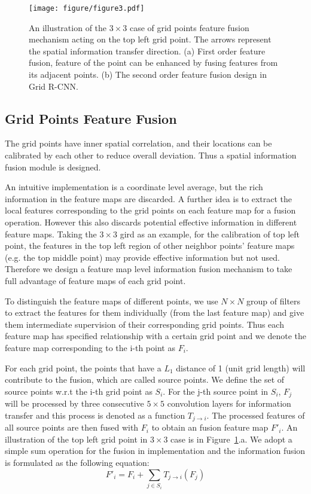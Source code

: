 \documentclass[10pt,twocolumn,letterpaper]{article}
\begin{document}
\begin{figure}[t]
\centering
\texttt{[image: figure/figure3.pdf]}
\caption{An illustration of the $3 \times 3$ case of grid points feature fusion mechanism acting on the top left grid point. The arrows represent the spatial information transfer direction. (a) First order feature fusion, feature of the point can be enhanced by fusing features from its adjacent points. (b) The second order feature fusion design in Grid R-CNN.}
\label{fig:fusion}
\end{figure}


\subsection{Grid Points Feature Fusion}
The grid points have inner spatial correlation, and their locations can be calibrated by each other to reduce overall deviation. Thus a spatial information fusion module is designed.

An intuitive implementation is a coordinate level average, but the rich information in the feature maps are discarded. 
A further idea is to extract the local features corresponding to the grid points on each feature map for a fusion operation. However this also discards potential effective information in different feature maps. Taking the $3 \times 3$ gird as an example, for the calibration of top left point, the features in the top left region of other neighbor points' feature maps (e.g. the top middle point) may provide effective information but not used.
Therefore we design a feature map level information fusion mechanism to take full advantage of feature maps of each grid point. 

To distinguish the feature maps of different points, we use $N \times N$ group of filters to extract the features for them individually (from the last feature map) and give them intermediate supervision of their corresponding grid points. Thus each feature map has specified relationship with a certain grid point and we denote the feature map corresponding to the i-th point as $F_i$.

For each grid point, the points that have a $L_1$ distance of 1 (unit grid length) will contribute to the fusion, which are called source points. We define the set of source points w.r.t the i-th grid point as $S_i$. For the j-th source point in $S_i$, $F_j$ will be processed by three consecutive $5 \times 5$ convolution layers for information transfer and this process is denoted as a function $T_{j \rightarrow i}$. The processed features of all source points are then fused with $F_i$ to obtain an fusion feature map $F'_i$. An illustration of the top left grid point in $3 \times 3$ case is in Figure~\ref{fig:fusion}.a. We adopt a simple sum operation for the fusion in implementation and the information fusion is formulated as the following equation:
\begin{equation}
\label{eq:fusion}
F'_i = F_i + \sum_{j\in S_i } T_{j \rightarrow i}(F_j)
\end{equation}
\end{document}
